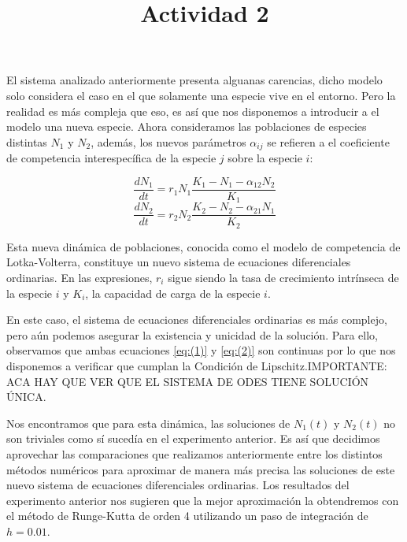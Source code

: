 \documentclass{article}
\title{Actividad 2}
\author{}
\begin{document}
\maketitle

\hspace{1cm} El sistema analizado anteriormente presenta alguanas carencias, dicho modelo solo considera el caso en el que solamente una especie vive en el entorno. Pero la realidad es más compleja 
que eso, es así que nos disponemos a introducir a el modelo una nueva especie. Ahora consideramos las poblaciones de especies distintas \(N_1\) y \(N_2\), además, los nuevos parámetros 
\(\alpha_{ij}\) se refieren a el coeficiente de competencia interespecífica de la especie \(j\) sobre la especie \(i\):

\begin{equation}
\frac {dN_1} {dt} = r_1N_1 \frac {K_1 - N_1 - \alpha_{12}N_2} {K_1} \label{eq:(1)}
\end{equation}
\begin{equation}
\frac {dN_2} {dt} = r_2N_2 \frac {K_2 - N_2 - \alpha_{21}N_1} {K_2} \label{eq:(2)}
\end{equation}

\hspace{1cm} Esta nueva dinámica de poblaciones, conocida como el modelo de competencia de Lotka-Volterra, constituye un nuevo sistema de ecuaciones diferenciales ordinarias. En las expresiones, 
\(r_i\) sigue siendo la tasa de crecimiento intrínseca de la especie \(i\) y \(K_i\), la capacidad de carga de la especie \(i\). 

\hspace{1cm} En este caso, el sistema de ecuaciones diferenciales ordinarias es más complejo, pero aún podemos asegurar la existencia y unicidad de la solución. Para ello, observamos que ambas
ecuaciones \ref{eq:(1)} y \ref{eq:(2)} son continuas por lo que nos disponemos a verificar que cumplan la Condición de Lipschitz.IMPORTANTE: ACA HAY QUE VER QUE EL SISTEMA DE ODES TIENE SOLUCIÓN ÚNICA. 

\hspace{1cm} Nos encontramos que para esta dinámica, las soluciones de \(N_1(t)\) y \(N_2(t)\) no son triviales como sí sucedía en el experimento anterior. Es así que decidimos aprovechar las comparaciones
que realizamos anteriormente entre los distintos métodos numéricos para aproximar de manera más precisa las soluciones de este nuevo sistema de ecuaciones diferenciales ordinarias. Los resultados 
del experimento anterior nos sugieren que la mejor aproximación la obtendremos con el método de Runge-Kutta de orden 4 utilizando un paso de integración de \(h = 0.01\). 
\end{document}

